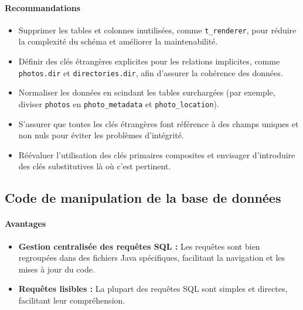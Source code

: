 \paragraph{Recommandations}
\begin{itemize}
    \item Supprimer les tables et colonnes inutilisées, comme \texttt{t\_renderer}, pour réduire la complexité du schéma et améliorer la maintenabilité.
    \item Définir des clés étrangères explicites pour les relations implicites, comme \texttt{photos.dir} et \texttt{directories.dir}, afin d'assurer la cohérence des données.
    \item Normaliser les données en scindant les tables surchargées (par exemple, diviser \texttt{photos} en \texttt{photo\_metadata} et \texttt{photo\_location}).
    \item S'assurer que toutes les clés étrangères font référence à des champs uniques et non nuls pour éviter les problèmes d'intégrité.
    \item Réévaluer l'utilisation des clés primaires composites et envisager d'introduire des clés substitutives là où c'est pertinent.
\end{itemize}

\subsection{Code de manipulation de la base de données}

\paragraph{Avantages}
\begin{itemize}
    \item \textbf{Gestion centralisée des requêtes SQL :} Les requêtes sont bien regroupées dans des fichiers Java spécifiques, facilitant la navigation et les mises à jour du code.
    \item \textbf{Requêtes lisibles :} La plupart des requêtes SQL sont simples et directes, facilitant leur compréhension.
\end{itemize}

